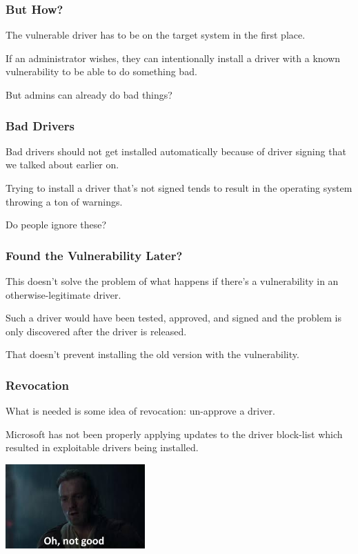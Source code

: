\begin{frame}
\frametitle{But How?}

The vulnerable driver has to be on the target system in the first place. 

If an administrator wishes, they can intentionally install a driver with a known vulnerability to be able to do something bad. 

But admins can already do bad things?

\end{frame}


\begin{frame}
\frametitle{Bad Drivers}
Bad drivers should not get installed automatically because of driver signing that we talked about earlier on.

Trying to install a driver that's not signed tends to result in the operating system throwing a ton of warnings.

Do people ignore these?

\end{frame}


\begin{frame}
\frametitle{Found the Vulnerability Later?}
This doesn't solve the problem of what happens if there's a vulnerability in an otherwise-legitimate driver.

Such a driver would have been tested, approved, and signed and the problem is only discovered after the driver is released.

That doesn't prevent installing the old version with the vulnerability.

\end{frame}


\begin{frame}
\frametitle{Revocation}

What is needed is some idea of revocation: un-approve a driver.

Microsoft has not been properly applying updates to the driver block-list which resulted in exploitable drivers being installed.

\begin{center}
	\includegraphics[width=0.4\textwidth]{images/notgood.jpg}
\end{center}

\end{frame}


